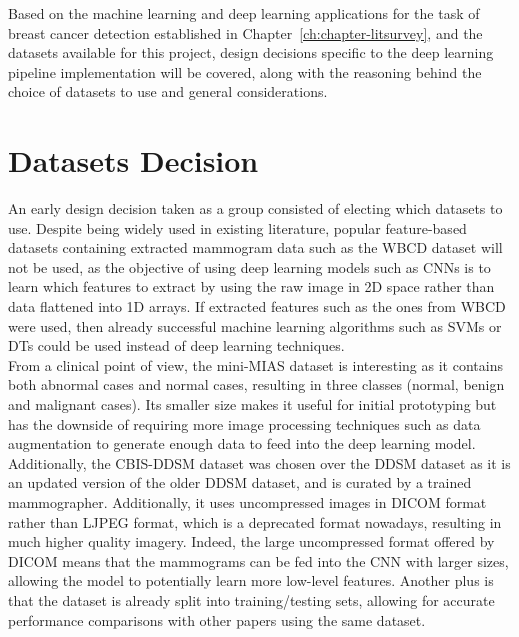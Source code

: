 Based on the machine learning and deep learning applications for the task of breast cancer detection established in Chapter~\ref{ch:chapter-litsurvey}, and the datasets available for this project, design decisions specific to the deep learning pipeline implementation will be covered, along with the reasoning behind the choice of datasets to use and general considerations.

\section{Datasets Decision}
\label{sec:design-dataset-decision}

An early design decision taken as a group consisted of electing which datasets to use. Despite being widely used in existing literature, popular feature-based datasets containing extracted mammogram data such as the WBCD dataset \citep{Wolberg1995} will not be used, as the objective of using deep learning models such as CNNs is to learn which features to extract by using the raw image in 2D space rather than data flattened into 1D arrays. If extracted features such as the ones from WBCD were used, then already successful machine learning algorithms such as SVMs or DTs could be used instead of deep learning techniques.\\

From a clinical point of view, the mini-MIAS dataset is interesting as it contains both abnormal cases and normal cases, resulting in three classes (normal, benign and malignant cases). Its smaller size makes it useful for initial prototyping but has the downside of requiring more image processing techniques such as data augmentation to generate enough data to feed into the deep learning model. Additionally, the CBIS-DDSM dataset was chosen over the DDSM dataset as it is an updated version of the older DDSM dataset, and is curated by a trained mammographer. Additionally, it uses uncompressed images in DICOM format rather than LJPEG format, which is a deprecated format nowadays, resulting in much higher quality imagery.  Indeed, the large uncompressed format offered by DICOM means that the mammograms can be fed into the CNN with larger sizes, allowing the model to potentially learn more low-level features. Another plus is that the dataset is already split into training/testing sets, allowing for accurate performance comparisons with other papers using the same dataset.\\



